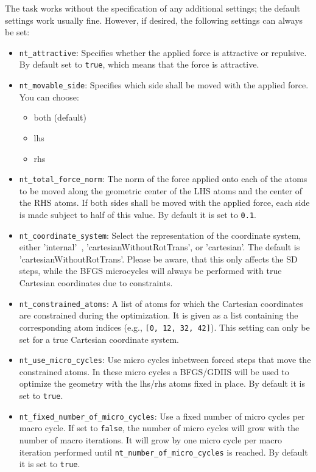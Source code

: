 \documentclass[]{tufte-book}
\begin{document}
The task works without the specification of any additional settings; the default settings work usually fine. However,
if desired, the following settings can always be set:
\begin{itemize}
\item \texttt{nt\_attractive}: Specifies whether the applied force is attractive or repulsive. By default set to
\texttt{true}, which means that the force is attractive.
\item \texttt{nt\_movable\_side}: Specifies which side shall be moved with the applied force. You can choose:
\begin{itemize}
\item both (default)
\item lhs
\item rhs
\end{itemize}
\item \texttt{nt\_total\_force\_norm}: The norm of the force applied onto each of the atoms to be moved along the geometric center of the LHS atoms and the center of the RHS atoms.
If both sides shall be moved with the applied force, each side is made subject to half of this value.
By default it is set to \texttt{0.1}.
\item \texttt{nt\_coordinate\_system}: Select the representation of the coordinate system, either
 'internal'~\cite{libirc}, 'cartesianWithoutRotTrans', or 'cartesian'. The default is 'cartesianWithoutRotTrans'.
Please be aware, that this only affects the SD steps, while the BFGS microcycles will always be performed with true
 Cartesian coordinates due to constraints.
\item \texttt{nt\_constrained\_atoms}: A list of atoms for which the Cartesian coordinates are constrained during the optimization.
  It is given as a list containing the corresponding atom indices (e.g., \texttt{[0, 12, 32, 42]}). This setting can only be set for a true Cartesian coordinate system.
\item \texttt{nt\_use\_micro\_cycles}: Use micro cycles inbetween forced steps that move the constrained atoms.
In these micro cycles a BFGS/GDIIS will be used to optimize the geometry with the lhs/rhs atoms fixed in place.
By default it is set to \texttt{true}.
\item \texttt{nt\_fixed\_number\_of\_micro\_cycles}: Use a fixed number of micro cycles per macro cycle. If set to
\texttt{false}, the number of micro cycles will grow with the number of macro iterations. It will grow by one micro
cycle per macro iteration performed until \texttt{nt\_number\_of\_micro\_cycles} is reached. By default it is set to \texttt{true}.

\end{itemize}
\end{document}
